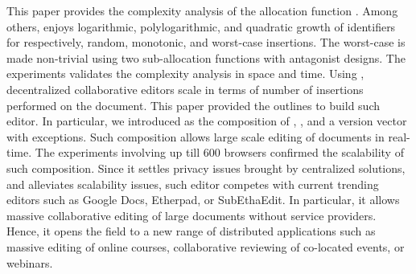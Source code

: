 This paper provides the complexity analysis of the allocation function
\LSEQ. Among others, \LSEQ enjoys logarithmic, polylogarithmic, and quadratic
growth of identifiers for respectively, random, monotonic, and worst-case
insertions. The worst-case is made non-trivial using two sub-allocation
functions with antagonist designs. The experiments validates the complexity
analysis in space and time.  Using \LSEQ, decentralized collaborative editors
scale in terms of number of insertions performed on the document. This paper
provided the outlines to build such editor. In particular, we introduced \CRATE
as the composition of \LSEQ, \SPRAY, and a version vector with exceptions. Such
composition allows large scale editing of documents in real-time. The
experiments involving up till 600 browsers confirmed the scalability of such
composition. Since it settles privacy issues brought by centralized solutions,
and alleviates scalability issues, such editor competes with current trending
editors such as Google Docs, Etherpad, or SubEthaEdit. In particular, it allows
massive collaborative editing of large documents without service
providers. Hence, it opens the field to a new range of distributed applications
such as massive editing of online courses, collaborative reviewing of co-located
events, or webinars.





